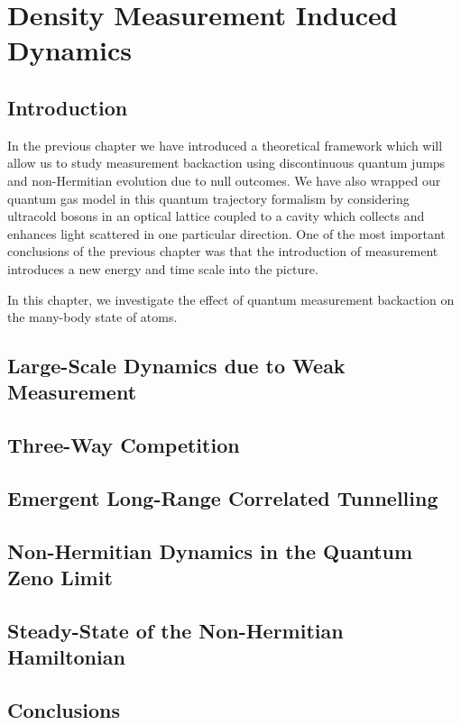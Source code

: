 
\chapter{Density Measurement Induced Dynamics}

\ifpdf
    \graphicspath{{Chapter5/Figs/Raster/}{Chapter5/Figs/PDF/}{Chapter5/Figs/}}
\else
    \graphicspath{{Chapter5/Figs/Vector/}{Chapter5/Figs/}}
\fi


\section{Introduction}

In the previous chapter we have introduced a theoretical framework
which will allow us to study measurement backaction using
discontinuous quantum jumps and non-Hermitian evolution due to null
outcomes. We have also wrapped our quantum gas model in this quantum
trajectory formalism by considering ultracold bosons in an optical
lattice coupled to a cavity which collects and enhances light
scattered in one particular direction. One of the most important
conclusions of the previous chapter was that the introduction of
measurement introduces a new energy and time scale into the picture.

In this chapter, we investigate the effect of quantum measurement
backaction on the many-body state of atoms. 

\section{Large-Scale Dynamics due to Weak Measurement}

\section{Three-Way Competition}

\section{Emergent Long-Range Correlated Tunnelling}

\section{Non-Hermitian Dynamics in the Quantum Zeno Limit}

\section{Steady-State of the Non-Hermitian Hamiltonian}

\section{Conclusions}